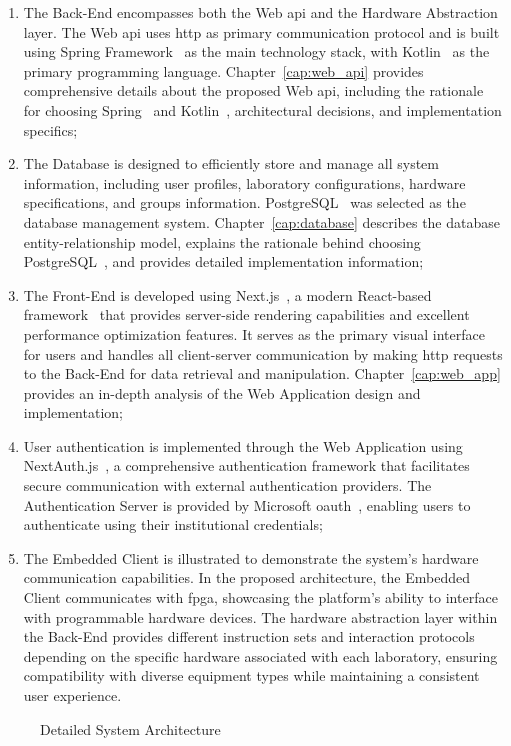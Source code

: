 \begin{enumerate}[label=\protect\circled{\arabic*}]
\item The Back-End encompasses both the Web \acs{api} and the Hardware Abstraction layer. The Web \acs{api} uses \ac{http} as primary communication protocol and is built using Spring Framework~\cite{spring-framework} as the main technology stack, with Kotlin~\cite{kotlin} as the primary programming language. Chapter~\ref{cap:web_api} provides comprehensive details about the proposed Web \acs{api}, including the rationale for choosing Spring~\cite{spring} and Kotlin~\cite{kotlin}, architectural decisions, and implementation specifics;
\item The Database is designed to efficiently store and manage all system information, including user profiles, laboratory configurations, hardware specifications, and groups information. PostgreSQL~\cite{postgresql} was selected as the database management system. Chapter~\ref{cap:database} describes the database entity-relationship model, explains the rationale behind choosing PostgreSQL~\cite{postgresql}, and provides detailed implementation information;
\item The Front-End is developed using Next.js~\cite{nextjs-docs}, a modern React-based framework~\cite{react} that provides server-side rendering capabilities and excellent performance optimization features. It serves as the primary visual interface for users and handles all client-server communication by making \acs{http} requests to the Back-End for data retrieval and manipulation. Chapter~\ref{cap:web_app} provides an in-depth analysis of the Web Application design and implementation;
\item User authentication is implemented through the Web Application using NextAuth.js~\cite{nextjs-authentication}, a comprehensive authentication framework that facilitates secure communication with external authentication providers. The Authentication Server is provided by Microsoft \ac{oauth}~\cite{microsoft-oauth}, enabling users to authenticate using their institutional credentials;
\item The Embedded Client is illustrated to demonstrate the system's hardware communication capabilities. In the proposed architecture, the Embedded Client communicates with \ac{fpga}, showcasing the platform's ability to interface with programmable hardware devices. The hardware abstraction layer within the Back-End provides different instruction sets and interaction protocols depending on the specific hardware associated with each laboratory, ensuring compatibility with diverse equipment types while maintaining a consistent user experience.
\end{enumerate}

\begin{figure}[H]
    \centering
    
\caption{Detailed System Architecture}
\label{fig:detailed_architecture}
\end{figure}